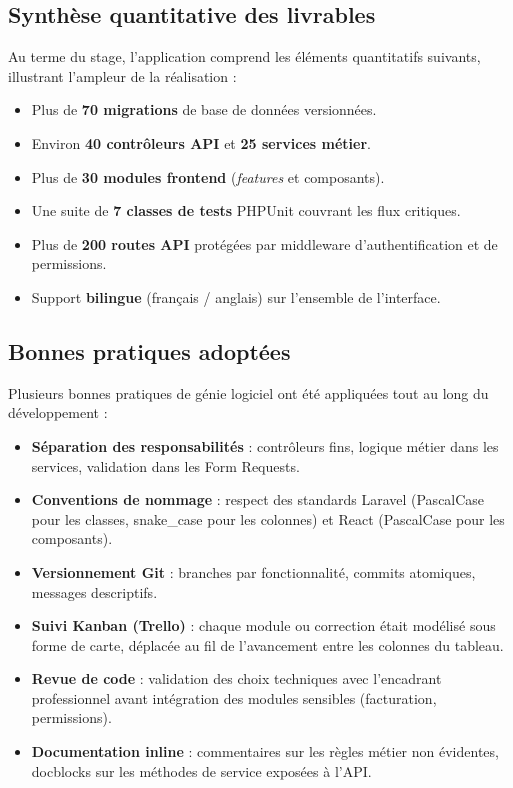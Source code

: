 \subsection{Synthèse quantitative des livrables}

Au terme du stage, l'application comprend les éléments quantitatifs suivants,
illustrant l'ampleur de la réalisation :

\begin{itemize}
  \item Plus de \textbf{70 migrations} de base de données versionnées.
  \item Environ \textbf{40 contrôleurs API} et \textbf{25 services métier}.
  \item Plus de \textbf{30 modules frontend} (\textit{features} et composants).
  \item Une suite de \textbf{7 classes de tests} PHPUnit couvrant les flux critiques.
  \item Plus de \textbf{200 routes API} protégées par middleware d'authentification
  et de permissions.
  \item Support \textbf{bilingue} (français / anglais) sur l'ensemble de l'interface.
\end{itemize}

\subsection{Bonnes pratiques adoptées}

Plusieurs bonnes pratiques de génie logiciel ont été appliquées tout au long du
développement :

\begin{itemize}
  \item \textbf{Séparation des responsabilités} : contrôleurs fins, logique métier
  dans les services, validation dans les Form Requests.
  \item \textbf{Conventions de nommage} : respect des standards Laravel (PascalCase
  pour les classes, snake\_case pour les colonnes) et React (PascalCase pour les
  composants).
  \item \textbf{Versionnement Git} : branches par fonctionnalité, commits atomiques,
  messages descriptifs.
  \item \textbf{Suivi Kanban (Trello)} : chaque module ou correction était modélisé
  sous forme de carte, déplacée au fil de l'avancement entre les colonnes du tableau.
  \item \textbf{Revue de code} : validation des choix techniques avec l'encadrant
  professionnel avant intégration des modules sensibles (facturation, permissions).
  \item \textbf{Documentation inline} : commentaires sur les règles métier non
  évidentes, docblocks sur les méthodes de service exposées à l'API.
\end{itemize}

